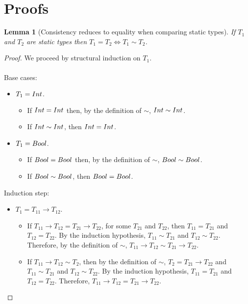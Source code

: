 \documentclass[a4paper]{article}
\newtheorem{lemma}{Lemma}
\begin{document}
\newpage

\section{Proofs}
\begin{lemma}[Consistency reduces to equality when comparing static types]
\label{consistencytoequality}
If $T_1$ and $T_2$ are static types then $T_1 = T_2 \iff T_1 \sim T_2$.
\end{lemma}
\begin{proof}
We proceed by structural induction on $T_1$.\\\\
Base cases:
\begin{itemize}
    \item $T_1 = {Int}$.
    \begin{itemize}
        \item If ${Int} = {Int}$ then, by the definition of $\sim$, ${Int} \sim {\ensuremath{Int}}$.
        \item If ${Int} \sim {\ensuremath{Int}}$, then ${Int} = {Int}$.
    \end{itemize}
    \item $T_1 = Bool$.
    \begin{itemize}
        \item If $Bool = Bool$ then, by the definition of $\sim$, $Bool \sim Bool$.
        \item If $Bool \sim Bool$, then $Bool = Bool$.
    \end{itemize}
\end{itemize}
Induction step:
\begin{itemize}
    \item $T_1 = T_{11} \rightarrow T_{12}$.
    \begin{itemize}
        \item If $T_{11} \rightarrow T_{12} = T_{21} \rightarrow T_{22}$, for some $T_{21}$ and $T_{22}$, then $T_{11} = T_{21}$ and $T_{12} = T_{22}$.
        By the induction hypothesis, $T_{11} \sim T_{21}$ and $T_{12} \sim T_{22}$.
        Therefore, by the definition of $\sim$, $T_{11} \rightarrow T_{12} \sim T_{21} \rightarrow T_{22}$.
        \item If $T_{11} \rightarrow T_{12} \sim T_2$, then by the definition of $\sim$, $T_2 = T_{21} \rightarrow T_{22}$ and $T_{11} \sim T_{21}$ and $T_{12} \sim T_{22}$.
        By the induction hypothesis, $T_{11} = T_{21}$ and $T_{12} = T_{22}$.
        Therefore, $T_{11} \rightarrow T_{12} = T_{21} \rightarrow T_{22}$.
    \end{itemize}

\end{itemize}
\end{proof}
\end{document}
